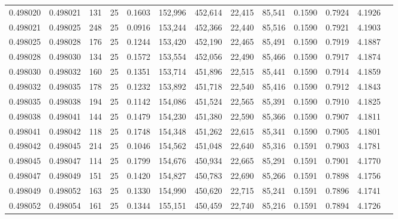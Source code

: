 \begin{tabular}{rrrrrrrrrrrrr}
0.498020 & 0.498021 & 131 &  25 &                                     0.1603 & 152,996 & 452,614 &  22,415 &  85,541 & 0.1590 & 0.7924 & 4.1926 \\
0.498021 & 0.498025 & 248 &  25 &                                     0.0916 & 153,244 & 452,366 &  22,440 &  85,516 & 0.1590 & 0.7921 & 4.1903 \\
0.498025 & 0.498028 & 176 &  25 &                                     0.1244 & 153,420 & 452,190 &  22,465 &  85,491 & 0.1590 & 0.7919 & 4.1887 \\
0.498028 & 0.498030 & 134 &  25 &                                     0.1572 & 153,554 & 452,056 &  22,490 &  85,466 & 0.1590 & 0.7917 & 4.1874 \\
0.498030 & 0.498032 & 160 &  25 &                                     0.1351 & 153,714 & 451,896 &  22,515 &  85,441 & 0.1590 & 0.7914 & 4.1859 \\
0.498032 & 0.498035 & 178 &  25 &                                     0.1232 & 153,892 & 451,718 &  22,540 &  85,416 & 0.1590 & 0.7912 & 4.1843 \\
0.498035 & 0.498038 & 194 &  25 &                                     0.1142 & 154,086 & 451,524 &  22,565 &  85,391 & 0.1590 & 0.7910 & 4.1825 \\
0.498038 & 0.498041 & 144 &  25 &                                     0.1479 & 154,230 & 451,380 &  22,590 &  85,366 & 0.1590 & 0.7907 & 4.1811 \\
0.498041 & 0.498042 & 118 &  25 &                                     0.1748 & 154,348 & 451,262 &  22,615 &  85,341 & 0.1590 & 0.7905 & 4.1801 \\
0.498042 & 0.498045 & 214 &  25 &                                     0.1046 & 154,562 & 451,048 &  22,640 &  85,316 & 0.1591 & 0.7903 & 4.1781 \\
0.498045 & 0.498047 & 114 &  25 &                                     0.1799 & 154,676 & 450,934 &  22,665 &  85,291 & 0.1591 & 0.7901 & 4.1770 \\
0.498047 & 0.498049 & 151 &  25 &                                     0.1420 & 154,827 & 450,783 &  22,690 &  85,266 & 0.1591 & 0.7898 & 4.1756 \\
0.498049 & 0.498052 & 163 &  25 &                                     0.1330 & 154,990 & 450,620 &  22,715 &  85,241 & 0.1591 & 0.7896 & 4.1741 \\
0.498052 & 0.498054 & 161 &  25 &                                     0.1344 & 155,151 & 450,459 &  22,740 &  85,216 & 0.1591 & 0.7894 & 4.1726 \\

\end{tabular}

